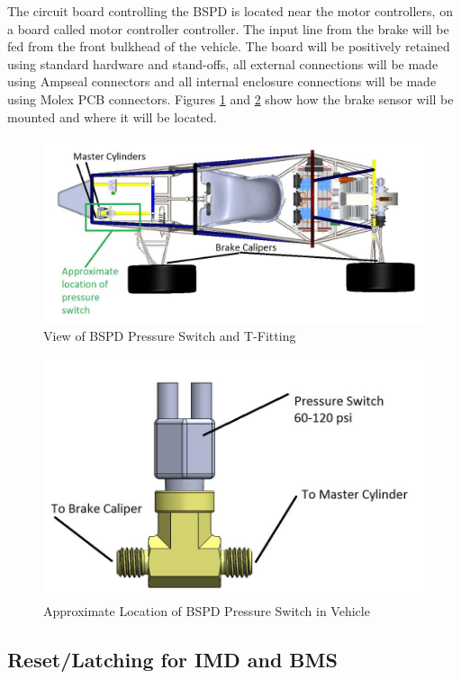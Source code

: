 \documentclass{article}
\begin{document}
            The circuit board controlling the BSPD is located near the motor controllers, on a board called motor controller controller. The input line from the brake will be fed from the front bulkhead of the vehicle. The board will be positively retained using standard hardware and stand-offs, all external connections will be made using Ampseal connectors and all internal enclosure connections will be made using Molex PCB connectors. Figures \ref{BSPDmech1} and \ref{BSPDmech2} show how the brake sensor will be mounted and where it will be located.

            \begin{figure}[H]
                \centering
                \includegraphics[width = 0.8 \textwidth]{brakeincar}
                \caption{View of BSPD Pressure Switch and T-Fitting}
                \label{BSPDmech1}
            \end{figure}

            \begin{figure}[H]
                \centering
                \includegraphics[width = 0.7 \textwidth]{brakesensor}
                \caption{Approximate Location of BSPD Pressure Switch in Vehicle}
                \label{BSPDmech2}
            \end{figure}

    \subsection{Reset/Latching for IMD and BMS}
\end{document}
